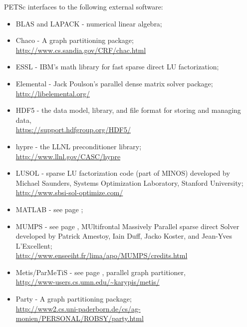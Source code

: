 \vspace{.3in}
\noindent
PETSc interfaces to the following external software:
\begin{itemize}
  \item BLAS and LAPACK - numerical linear algebra;
  \item Chaco - A graph partitioning package;\\\href{http://www.cs.sandia.gov/CRF/chac.html}{http://www.cs.sandia.gov/CRF/chac.html}
  \item ESSL -         IBM's math library for fast sparse direct LU factorization;
  \item Elemental -  Jack Poulson's parallel dense matrix solver package;\\\href{http://libelemental.org/}{http://libelemental.org/}
  \item HDF5 - the data model, library, and file format for storing and managing data,\\\href{https://support.hdfgroup.org/HDF5/}{https://support.hdfgroup.org/HDF5/}
  \item hypre -    the LLNL preconditioner library;\\\href{http://www.llnl.gov/CASC/hypre}{http://www.llnl.gov/CASC/hypre}
  \item LUSOL -       sparse LU factorization code (part of MINOS) developed by Michael Saunders,
                      Systems Optimization Laboratory, Stanford University;\\
                     \href{http://www.sbsi-sol-optimize.com/}{http://www.sbsi-sol-optimize.com/}
  \item MATLAB -      see page \pageref{ch_matlab};
  \item MUMPS -      see page \pageref{sec_externalsol}, MUltifrontal Massively Parallel sparse direct Solver developed by Patrick Amestoy,
                     Iain Duff, Jacko Koster, and Jean-Yves L'Excellent; \\
                     \href{http://www.enseeiht.fr/lima/apo/MUMPS/credits.html}{http://www.enseeiht.fr/lima/apo/MUMPS/credits.html}
  \item Metis/ParMeTiS - see page \pageref{sec_partitioning}, parallel graph partitioner,\\
                     \href{http://www-users.cs.umn.edu/~karypis/metis/}{http://www-users.cs.umn.edu/\~{}karypis/metis/}
  \item Party -     A graph partitioning package; \\ 
               \href{http://www2.cs.uni-paderborn.de/cs/ag-monien/PERSONAL/ROBSY/party.html}{http://www2.cs.uni-paderborn.de/cs/ag-monien/PERSONAL/ROBSY/party.html}

\end{itemize}
